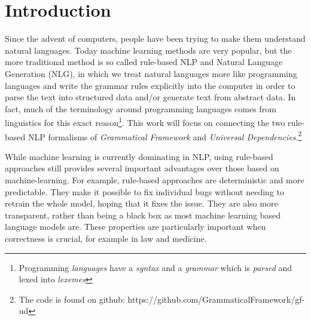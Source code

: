 \chapter{Introduction}

\newcommand{\note}[1]{\todo{#1}}


Since the advent of computers, people have been trying to make them understand natural languages. Today machine learning methods are very popular, but the more traditional method is so called rule-based 
\ac{NLP}
and Natural Language Generation (NLG), in which we treat natural languages more like programming languages and write the grammar rules explicitly into the computer in order to parse the text into structured data and/or generate text from abstract data.\cite{chomsky-1957,lambek-1958,curry1961some}
In fact, much of the terminology around programming languages comes from linguistics for this exact reason\footnote{Programming \emph{languages} have a \emph{syntax} and a \emph{grammar} which is \emph{parsed} and lexed into \emph{lexemes}}. This work will focus on connecting the two rule-based \ac{NLP} formalisms of \emph{Grammatical Framework}\cite{ranta-2011} and \emph{Universal Dependencies}\cite{nivre-etal-2016-universal}.\footnote{The code is found on github: https://github.com/GrammaticalFramework/gf-ud}


While machine learning is currently dominating in \ac{NLP}, using rule-based approaches still provides several important advantages over those based on machine-learning.
For example, rule-based approaches are deterministic and more predictable. They make it possible to fix individual bugs without needing to retrain the whole model, hoping that it fixes the issue. They are also more transparent, rather than being a black box as most machine learning based language models are. %
These properties are particularly important when correctness is crucial, for example in law and medicine.

